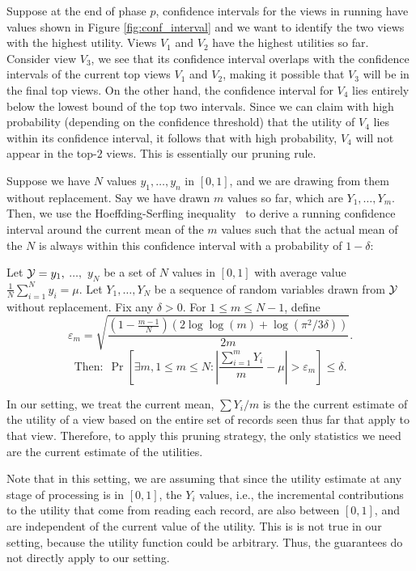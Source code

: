 Suppose at the end of phase $p$, confidence intervals for the views in
running have values shown in Figure \ref{fig:conf_interval} and we want to
identify the two views with the highest utility.
Views $V_1$ and $V_2$ have the highest utilities so far.
Consider view $V_3$, we see that its confidence interval overlaps with the
confidence intervals of the current top views $V_1$ and $V_2$, making it possible
that $V_3$ will be in the final top views. On the other hand, the confidence
interval for $V_4$ lies entirely below the lowest bound of the top two
intervals.
Since we can claim with high probability (depending on the confidence threshold)
that the utility of $V_4$ lies within its confidence interval, it follows that
with high probability, $V_4$ will not appear in the top-$2$ views.
This is essentially our pruning rule. 



Suppose we have $N$ values $y_1, \ldots, y_n$ in $[0, 1]$, and we are drawing
from them without replacement. 
Say we have drawn $m$ values so far, which are $Y_1, \ldots, Y_m$.
Then, we use the Hoeffding-Serfling inequality~\cite{serfling1974probability} 
to derive a running 
confidence interval around the current mean 
of the $m$ values such that the actual mean of the $N$
is always within this confidence interval with a probability of $1 - \delta$:
\begin{theorem}
\label{thm:hs}
Let $\mathcal{Y} = y_1,$ $\ldots,$ $y_N$ be a set of $N$ 
values in $[0,1]$ with average value
$\frac1N \sum_{i=1}^N y_i = \mu$.
Let $Y_1,\ldots,Y_N$ be a 
sequence of random variables drawn from $\mathcal{Y}$ without
replacement.
Fix any $\delta > 0$. For $1 \le m \le N-1$, define
$$
\varepsilon_m = \sqrt{\frac{(1-\frac{m-1}N)(2\log \log (m) + \log(\pi^2/3\delta))}{2m}}.
$$
$$
\textrm{Then:} \ \   \Pr\left[ \exists m, 1 \le m \le N : 
  \left|\frac{\sum_{i=1}^m Y_i}{m} - \mu\right| > \varepsilon_m \right] 
\le \delta.
$$
\end{theorem}
In our setting, we treat the current mean, $\sum Y_i / m$ is the 
the current estimate of the utility of a view 
based on the entire set of records seen thus far that apply to that view. 
Therefore, to apply this pruning strategy, the only statistics
we need are the current estimate of the utilities.

Note that in this setting, we are assuming that since the
utility estimate at any stage of processing is in $[0, 1]$, 
the $Y_i$ values, i.e., the incremental contributions to the utility
that come from reading each record, are also between $[0, 1]$,
and are independent of the current value of the utility. 
This is is not true in our setting, 
because the utility function could be arbitrary.
Thus, the guarantees do not directly apply to our setting. 

